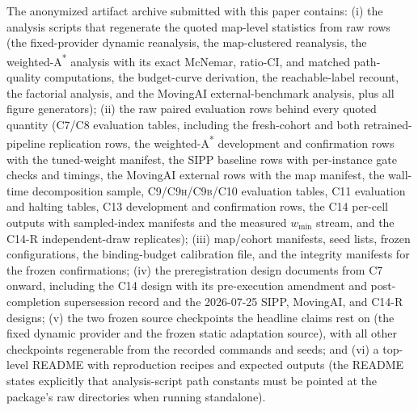 \documentclass[letterpaper]{article} %
\newcommand{\stage}[1]{\textsc{#1}}
\begin{document}
The anonymized artifact archive submitted with this paper contains: (i) the analysis scripts that regenerate the quoted map-level statistics from raw rows (the fixed-provider dynamic reanalysis, the map-clustered reanalysis, the weighted-A\textsuperscript{*} analysis with its exact McNemar, ratio-CI, and matched path-quality computations, the budget-curve derivation, the reachable-label recount, the factorial analysis, and the MovingAI external-benchmark analysis, plus all figure generators); (ii) the raw paired evaluation rows behind every quoted quantity (\stage{C7}/\stage{C8} evaluation tables, including the fresh-cohort and both retrained-pipeline replication rows, the weighted-A\textsuperscript{*} development and confirmation rows with the tuned-weight manifest, the SIPP baseline rows with per-instance gate checks and timings, the MovingAI external rows with the map manifest, the wall-time decomposition sample, \stage{C9}/\stage{C9h}/\stage{C9b}/\stage{C10} evaluation tables, \stage{C11} evaluation and halting tables, \stage{C13} development and confirmation rows, the \stage{C14} per-cell outputs with sampled-index manifests and the measured $w_{\min}$ stream, and the \stage{C14-R} independent-draw replicates); (iii) map/cohort manifests, seed lists, frozen configurations, the binding-budget calibration file, and the integrity manifests for the frozen confirmations; (iv) the preregistration design documents from \stage{C7} onward, including the \stage{C14} design with its pre-execution amendment and post-completion supersession record and the 2026-07-25 SIPP, MovingAI, and \stage{C14-R} designs; (v) the two frozen source checkpoints the headline claims rest on (the fixed dynamic provider and the frozen static adaptation source), with all other checkpoints regenerable from the recorded commands and seeds; and (vi) a top-level README with reproduction recipes and expected outputs (the README states explicitly that analysis-script path constants must be pointed at the package's raw directories when running standalone).



\end{document}
